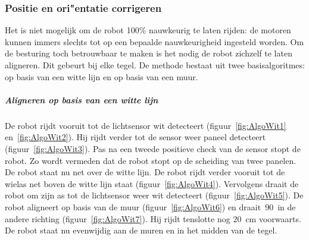 \documentclass[eind]{penoverslag}
\begin{document}
\subsubsection{Positie en ori"entatie corrigeren}
\label{sssec:AlgoAllign}
Het is niet mogelijk om de robot 100\% nauwkeurig te laten rijden: de motoren kunnen immers slechts tot op een bepaalde nauwkeurigheid ingesteld worden. Om de besturing toch betrouwbaar te maken is het nodig de robot zichzelf te laten aligneren. Dit gebeurt bij elke tegel.
De methode bestaat uit twee basisalgoritmes: op basis van een witte lijn en op basis van een muur.

\subparagraph{Aligneren op basis van een witte lijn}
De robot rijdt vooruit tot de lichtsensor wit detecteert (figuur~\ref{fig:AlgoWit1} en~\ref{fig:AlgoWit2}). Hij rijdt verder tot de sensor weer paneel detecteert (figuur~\ref{fig:AlgoWit3}). Pas na een tweede positieve check van de sensor stopt de robot. Zo wordt vermeden dat de robot stopt op de scheiding van twee panelen. De robot staat nu net over de witte lijn. De robot rijdt verder vooruit tot de wielas net boven de witte lijn staat (figuur~\ref{fig:AlgoWit4}). Vervolgens draait de robot om zijn as tot de lichtsensor weer wit detecteert (figuur~\ref{fig:AlgoWit5}). De robot aligneert op basis van de muur (figuur~\ref{fig:AlgoWit6}) en draait~90\degree~in de andere richting (figuur~\ref{fig:AlgoWit7}). Hij rijdt tenslotte nog $20$~cm voorwaarts. De robot staat nu evenwijdig aan de muren en in het midden van de tegel.
\end{document}
